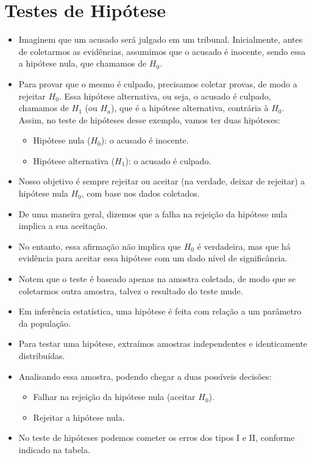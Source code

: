\documentclass{article}
\begin{document}
\section{Testes de Hipótese}
\begin{itemize}
    \item Imaginem que um acusado será julgado em um tribunal. Inicialmente, antes de coletarmos as evidências, assumimos que o acusado é inocente, sendo essa a hipótese nula, que chamamos de $H_0$.
    \item Para provar que o mesmo é culpado, precisamos coletar provas, de modo a rejeitar $H_0$. Essa hipótese alternativa, ou seja, o acusado é culpado, chamamos de $H_1$ (ou $H_a$), que é a hipótese alternativa, contrária à $H_0$. Assim, no teste de hipóteses desse exemplo, vamos ter duas hipóteses:
    \begin{itemize}
        \item Hipótese nula ($H_0$): o acusado é inocente.
        \item Hipótese alternativa ($H_1$): o acusado é culpado.
    \end{itemize}
    \item Nosso objetivo é sempre rejeitar ou aceitar (na verdade, deixar de rejeitar) a hipótese nula $H_0$, com base nos dados coletados.
    \item De uma maneira geral, dizemos que a falha na rejeição da hipótese nula implica a sua aceitação.
    \item No entanto, essa afirmação não implica que $H_0$ é verdadeira, mas que há evidência para aceitar essa hipótese com um dado nível de significância.
    \item Notem que o teste é baseado apenas na amostra coletada, de modo que se coletarmos outra amostra, talvez o resultado do teste mude.
    \item Em inferência estatística, uma hipótese é feita com relação a um parâmetro da população.
    \item Para testar uma hipótese, extraímos amostras independentes e identicamente distribuídas.
    \item Analisando essa amostra, podendo chegar a duas possíveis decisões:
    \begin{itemize}
        \item Falhar na rejeição da hipótese nula (aceitar $H_0$).
        \item Rejeitar a hipótese nula.
    \end{itemize}
    \item No teste de hipóteses podemos cometer os erros dos tipos I e II, conforme indicado na tabela.

\end{itemize}
\end{document}
